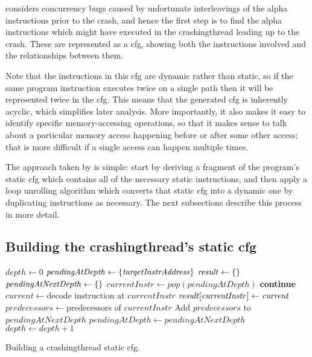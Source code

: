 {\Technique} considers concurrency bugs caused by unfortunate
interleavings of the \gls{alpha} instructions prior to the crash, and
hence the first step is to find the \gls{alpha} instructions which
might have executed in the \gls{crashingthread} leading up to the
crash.  These are represented as a \gls{cfg}, showing both the
instructions involved and the relationships between them.

Note that the instructions in this \gls{cfg} are dynamic rather than
static, so if the same program instruction executes twice on a single
path then it will be represented twice in the \gls{cfg}.  This means
that the generated \gls{cfg} is inherently acyclic, which simplifies
later analysis.  More importantly, it also makes it easy to identify
specific memory-accessing operations, so that it makes sense to talk
about a particular memory access happening before or after some other
access; that is more difficult if a single access can happen multiple
times.

The approach taken by {\technique} is simple: start by deriving a
fragment of the program's static \gls{cfg} which contains all of the
necessary static instructions, and then apply a loop unrolling
algorithm which converts that static \gls{cfg} into a dynamic one by
duplicating instructions as necessary.  The next subsections describe
this process in more detail.

\subsection[Building the \glsentrytext{crashingthread}'s static \glsentrytext{cfg}]{Building the \gls{crashingthread}'s static \gls{cfg}}
\label{sect:derive:build_static_cfg}

\begin{sanefig}
\begin{algorithmic}[1]
\State $\mathit{depth} \gets 0$
\State $\mathit{pendingAtDepth} \gets \{\mathit{targetInstrAddress}\}$
\State $\mathit{result} \gets \{\}$
  \State $\mathit{pendingAtNextDepth} \gets \{\}$
    \State $\mathit{currentInstr} \gets \mathit{pop}(\mathit{pendingAtDepth})$
      \State \textbf{continue}
    \EndIf
    \State $\mathit{current} \gets \text{decode instruction at } \mathit{currentInstr}$
    \State $\mathit{result}[\mathit{currentInstr}] \gets \mathit{current}$
    \State $\mathit{predecessors} \gets \text{predecessors of } \mathit{currentInstr}$
    \State Add $\mathit{predecessors}$ to $\mathit{pendingAtNextDepth}$
  \EndWhile
  \State $\mathit{pendingAtDepth} \gets \mathit{pendingAtNextDepth}$
  \State $\mathit{depth} \gets \mathit{depth} + 1$
\EndWhile
\end{algorithmic}
\vspace{-6pt}
\caption{Building a \gls{crashingthread} static \gls{cfg}.}
\label{fig:derive:static_read_cfg_single_function}
\end{sanefig}

